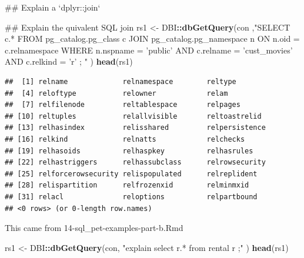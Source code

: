 \documentclass[]{book}
\newenvironment{Shaded}{\begin{snugshade}}{\end{snugshade}}
\newcommand{\KeywordTok}[1]{\textcolor[rgb]{0.13,0.29,0.53}{\textbf{#1}}}
\newcommand{\NormalTok}[1]{#1}
\newcommand{\OperatorTok}[1]{\textcolor[rgb]{0.81,0.36,0.00}{\textbf{#1}}}
\newcommand{\StringTok}[1]{\textcolor[rgb]{0.31,0.60,0.02}{#1}}
\theoremstyle{definition}
\theoremstyle{definition}
\theoremstyle{definition}
\theoremstyle{remark}
\begin{document}
\begin{Shaded}
\begin{Highlighting}[]
\NormalTok{## Explain a `dplyr::join`}

\NormalTok{## Explain the quivalent SQL join}
\NormalTok{rs1 <-}\StringTok{ }\NormalTok{DBI}\OperatorTok{::}\KeywordTok{dbGetQuery}\NormalTok{(con}
\NormalTok{                 ,}\StringTok{"SELECT c.* }
\StringTok{                     FROM pg_catalog.pg_class c}
\StringTok{                     JOIN pg_catalog.pg_namespace n ON n.oid = c.relnamespace}
\StringTok{                    WHERE  n.nspname = 'public'}
\StringTok{                      AND  c.relname = 'cust_movies'}
\StringTok{                      AND  c.relkind = 'r'}
\StringTok{                   ;}
\StringTok{                 "}
\NormalTok{                 )}
\KeywordTok{head}\NormalTok{(rs1)}
\end{Highlighting}
\end{Shaded}

\begin{verbatim}
##  [1] relname             relnamespace        reltype            
##  [4] reloftype           relowner            relam              
##  [7] relfilenode         reltablespace       relpages           
## [10] reltuples           relallvisible       reltoastrelid      
## [13] relhasindex         relisshared         relpersistence     
## [16] relkind             relnatts            relchecks          
## [19] relhasoids          relhaspkey          relhasrules        
## [22] relhastriggers      relhassubclass      relrowsecurity     
## [25] relforcerowsecurity relispopulated      relreplident       
## [28] relispartition      relfrozenxid        relminmxid         
## [31] relacl              reloptions          relpartbound       
## <0 rows> (or 0-length row.names)
\end{verbatim}

This came from 14-sql\_pet-examples-part-b.Rmd

\begin{Shaded}
\begin{Highlighting}[]
\NormalTok{rs1 <-}\StringTok{ }\NormalTok{DBI}\OperatorTok{::}\KeywordTok{dbGetQuery}\NormalTok{(con,}
                \StringTok{"explain select r.*}
\StringTok{                   from rental r }
\StringTok{                 ;"}
\NormalTok{                )  }
\KeywordTok{head}\NormalTok{(rs1)}
\end{Highlighting}
\end{Shaded}
\end{document}
